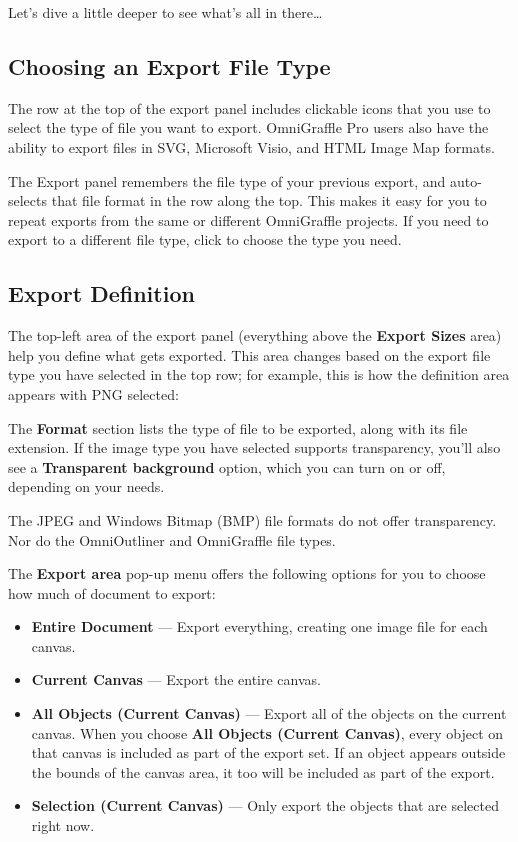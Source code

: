 \documentclass[../main.tex]{subfiles}
\begin{document}
Let's dive a little deeper to see what's all in there\ldots{}

\subsection{Choosing an Export File Type}

The row at the top of the export panel includes clickable icons that you use to select the type
of file you want to export. OmniGraffle Pro users also have the ability to export files in
SVG, Microsoft Visio, and HTML Image Map formats.


The Export panel remembers the file type of your previous export, and auto-selects that file
format in the row along the top. This makes it easy for you to repeat exports from the same or
different OmniGraffle projects. If you need to export to a different file type, click to
choose the type you need.

\subsection{Export Definition}

The top-left area of the export panel (everything above the \textbf{Export Sizes} area) help you
define what gets exported. This area changes based on the export file type you have selected
in the top row; for example, this is how the definition area appears with PNG selected:


The \textbf{Format} section lists the type of file to be exported, along with its file
extension. If the image type you have selected supports transparency, you'll also see a
\textbf{Transparent background} option, which you can turn on or off, depending on your needs.

\begin{ognote}
  The JPEG and Windows Bitmap (BMP) file formats do not offer transparency. Nor do the
  OmniOutliner and OmniGraffle file types.
\end{ognote}

The \textbf{Export area} pop-up menu offers the following options for you to choose how much of
document to export:

\begin{itemize}
  \item \textbf{Entire Document} --- Export everything, creating one image file for each canvas.
  \item \textbf{Current Canvas} --- Export the entire canvas.
  \item \textbf{All Objects (Current Canvas)} --- Export all of the objects on the current
    canvas. When you choose \textbf{All Objects (Current Canvas)}, every object on that canvas
    is included as part of the export set. If an object appears outside the bounds of the canvas
    area, it too will be included as part of the export.
  \item \textbf{Selection (Current Canvas)} --- Only export the objects that are selected right
    now.
\end{itemize}
\end{document}

